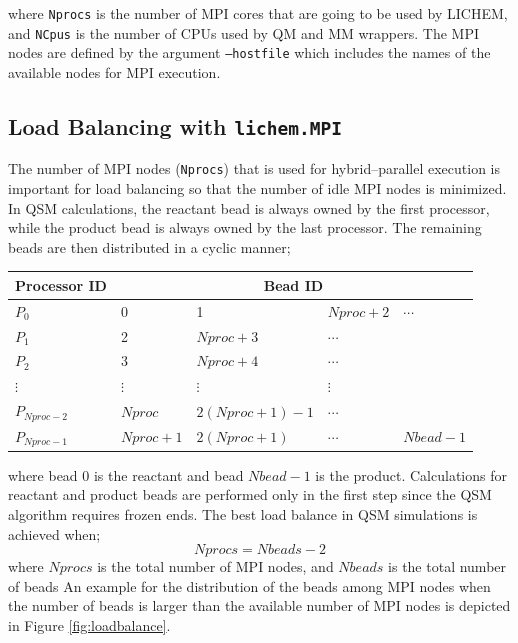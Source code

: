 \documentclass[12pt]{report}
\begin{document}
\noindent where \texttt{Nprocs}
is the number of MPI cores that
are going to be used by LICHEM, and \texttt{NCpus}
is the number of CPUs used
by QM and MM wrappers.
The MPI nodes are defined by the argument \texttt{--hostfile}
which includes the names of the available nodes for
MPI execution.

\subsection{Load Balancing with \texttt{lichem.MPI}}

The number of MPI nodes (\texttt{Nprocs})
that is used for hybrid--parallel execution
is important for load balancing
so that the number of idle MPI nodes
is minimized.
In QSM calculations,
the reactant bead is always owned by the first
processor, while the product bead is always
owned by
the last processor.
The remaining beads are
then distributed in a cyclic manner;
\begin{center}
\renewcommand{\arraystretch}{1.1}
\begin{table}[!ht]
\centering
\begin{tabular}{m{4cm} m{2cm} m{3cm} m{2cm} m{2cm}}
\textbf{Processor} ID & \multicolumn{4}{c}{\textbf{Bead ID}} \\
\hline
$P_0$ & 0 & 1 & $Nproc+2$ & $\cdots$ \\
$P_1$ & 2 & $Nproc+3$ & $\cdots$ & \\
$P_2$ & 3 & $Nproc+4$ & $\cdots$ &  \\
$\vdots$ & $\vdots$ & $\vdots$ & $\vdots$  &  \\
$P_{Nproc-2}$ & $Nproc$  & $2(Nproc+1)-1$ & $\cdots$ & \\
$P_{Nproc-1}$ & $Nproc+1$ & $2(Nproc+1)$ & $\cdots$ & $Nbead-1$
\end{tabular}
\end{table}
\end{center}
\vspace*{-18pt}
where bead $0$ is the reactant and
bead $Nbead-1$ is
the product.
Calculations for reactant and product beads
are performed only in the first
step since the QSM algorithm
requires frozen ends.
The best load balance
in QSM simulations
is achieved when;
\begin{equation}
Nprocs = Nbeads - 2 \nonumber
\end{equation}
where $Nprocs$ is the total
number of MPI nodes, and $Nbeads$ is
the total number of beads An example
for the distribution of the beads among MPI
nodes when the number of beads is larger than the
available number of MPI nodes is depicted in Figure \ref{fig:loadbalance}.
\end{document}
